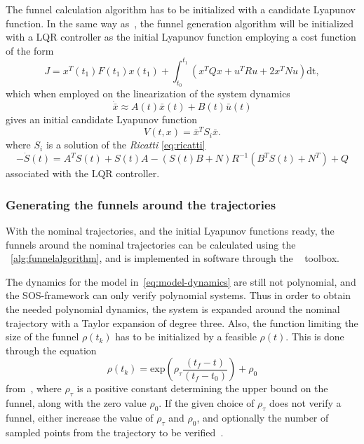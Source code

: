 The funnel calculation algorithm has to be initialized with a candidate Lyapunov
function. In the same way
as~\cite[Majumdar]{majumdarFunnelLibrariesRealtime2017}, the funnel generation
algorithm will be initialized with a \ac{LQR} controller as the initial Lyapunov
function employing a cost function of the form
\begin{equation}
  J = x^{T}(t_1)F(t_1)x(t_1) + \int_{t_{0}}^{t_{1}} \left( x^{T}Qx + u^{T}Ru + 2x^TNu \right) \mathrm{dt},
\end{equation}
which when employed on the linearization of the system dynamics
\begin{equation}
  \dot{\bar{x}} \approx A(t)\bar{x}(t) + B(t)\bar{u}(t)
\end{equation}
gives an initial candidate Lyapunov function
\begin{equation}
  V(t,x) = {\bar{x}}^{T}S_{i}\bar{x}.
\end{equation}
where \(S_{i}\) is a solution of the \textit{Ricatti} \cref{eq:ricatti}
\begin{equation}
  \label{eq:ricatti}
  - \dot{S}(t) = A^{T}S(t) +S(t)A - \left( S(t)B + N \right)R^{-1}\left( B^{T}S(t) + N^{T} \right) + Q
\end{equation} 
associated with the \ac{LQR} controller.

\subsubsection{Generating the funnels around the trajectories}
\label{subsec:generating-funnels}

With the nominal trajectories, and the initial Lyapunov functions ready, the
funnels around the nominal trajectories can be calculated using the
~\cref{alg:funnelalgorithm}, and is implemented in software through the
~\cite[sostools]{sostools} toolbox.

The dynamics for the model in~\cref{eq:model-dynamics} are still not polynomial,
and the \ac{SOS}-framework can only verify polynomial systems. Thus in order to
obtain the needed polynomial dynamics, the system is expanded around the nominal
trajectory with a Taylor expansion of degree three. Also, the function limiting
the size of the funnel \(\rho(t_{k})\) has to be initialized by a feasible
\(\rho(t)\). This is done through the equation
\begin{equation}
  \rho(t_{k}) = \mathrm{exp}\left( \rho_{\tau}\frac{\left( t_{f} - t \right)}{\left( t_{f} - t_{0}  \right)}\right) + \rho_0
\end{equation}
from~\cite[eq.~6.sec~3]{Tobenkin_2011}, where \(\rho_{\tau}\) is a positive
constant determining the upper bound on the funnel, along with the zero value
\(\rho_0\). If the given choice of \(\rho_{\tau}\) does not verify a funnel,
either increase the value of \(\rho_{\tau}\) and \(\rho_0\), and optionally the
number of sampled points from the trajectory to be
verified~\cite{Tobenkin_2011}.

